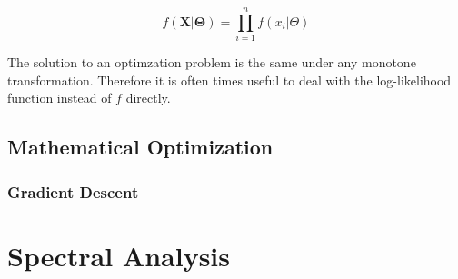 \documentclass[11pt, oneside, a4paper]{report}
\begin{document}
\begin{equation}  
  \label{ml-iid}
  f(\boldsymbol{X}|\boldsymbol{\Theta}) = \prod_{i = 1}^n f(x_i|\Theta)
\end{equation}

The solution to an optimzation problem is the same under any monotone transformation. Therefore it is often times useful to deal with the log-likelihood function instead of $f$ directly.


\subsection{Mathematical Optimization}\label{optimization}


\subsubsection{Gradient Descent}


\section{Spectral Analysis}












\end{document}
